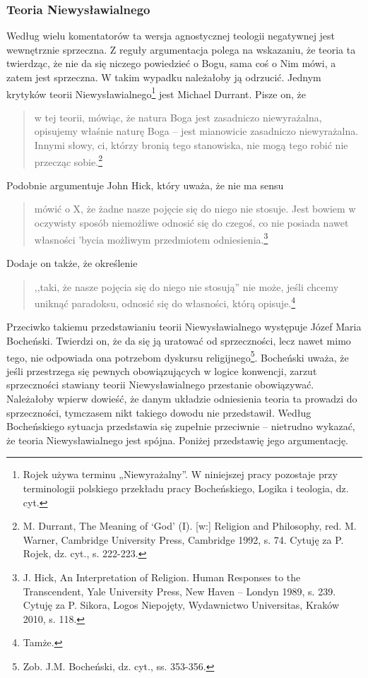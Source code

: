 \subsubsection{Teoria Niewysławialnego}

Według wielu komentatorów ta wersja agnostycznej teologii negatywnej
jest wewnętrznie sprzeczna. Z reguły argumentacja polega na wskazaniu,
że teoria ta twierdząc, że nie da się niczego powiedzieć o Bogu, sama
coś o Nim mówi, a zatem jest sprzeczna. W takim wypadku należałoby ją
odrzucić. Jednym krytyków teorii Niewysławialnego\footnote{Rojek używa terminu „Niewyrażalny”. W
niniejszej pracy pozostaje przy terminologii polskiego przekładu pracy
Bocheńskiego, Logika i teologia, dz. cyt. } jest Michael Durrant.
Pisze on, że

\begin{quote}
    w tej teorii, mówiąc, że natura Boga jest zasadniczo niewyrażalna,
opisujemy właśnie naturę Boga -- jest mianowicie zasadniczo
niewyrażalna. Innymi słowy, ci, którzy bronią tego stanowiska, nie mogą
tego robić nie przecząc sobie.\footnote{M. Durrant, The Meaning of
‘God’ (I). [w:] Religion and Philosophy, red.  M. Warner, Cambridge
University Press, Cambridge 1992, s. 74. Cytuję za P. Rojek, dz. cyt.,
s. 222-223. }
\end{quote}


Podobnie argumentuje John Hick, który uważa, że nie ma sensu


\begin{quote}
mówić o X, że żadne nasze pojęcie się do niego nie stosuje. Jest bowiem
w oczywisty sposób niemożliwe odnosić się do czegoś, co nie posiada
nawet własności 'bycia możliwym przedmiotem
odniesienia.\footnote{J. Hick, An Interpretation of Religion. Human
Responses to the Transcendent, Yale University Press, New Haven –
Londyn 1989, s. 239. Cytuję za P. Sikora, Logos Niepojęty, Wydawnictwo
Universitas, Kraków 2010, s. 118. }
\end{quote}


Dodaje on także, że określenie

\begin{quote}
,,taki, że nasze pojęcia się do niego nie stosują'' nie może,
jeśli chcemy uniknąć paradoksu, odnosić się do własności, którą
opisuje.\footnote{Tamże. }
\end{quote}

Przeciwko takiemu przedstawianiu teorii Niewysławialnego występuje Józef
Maria Bocheński. Twierdzi on, że da się ją uratować od sprzeczności,
lecz nawet mimo tego, nie odpowiada ona potrzebom dyskursu
religijnego\footnote{Zob. J.M. Bocheński, dz. cyt., ss. 353-356.
}. Bocheński uważa, że jeśli przestrzega się pewnych obowiązujących w
logice konwencji, zarzut sprzeczności stawiany teorii Niewysławialnego
przestanie obowiązywać. Należałoby wpierw dowieść, że danym układzie
odniesienia teoria ta prowadzi do sprzeczności, tymczasem nikt takiego
dowodu nie przedstawił. Według Bocheńskiego sytuacja przedstawia się
zupełnie przeciwnie -- nietrudno wykazać, że teoria Niewysławialnego
jest spójna. Poniżej przedstawię jego argumentację.

